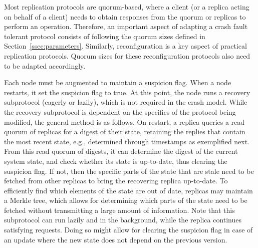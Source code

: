 Most replication protocols are quorum-based, where a client (or a
replica acting on behalf of a client) needs to obtain responses
from the quorum or replicas to perform an operation.  Therefore,
an important aspect of adapting a crash fault tolerant protocol
consists of following the quorum sizes defined in
Section~\ref{ssec:parameters}. Similarly, reconfiguration is
a key aspect of practical replication protocols. Quorum sizes for
these reconfiguration protocols also need to be adapted
accordingly.

Each node must be augmented to maintain a suspicion flag. When a node
restarts, it set the suspicion flag to true. At this point, the node
runs a recovery subprotocol (eagerly or lazily), which is not required
in the crash model.
While the recovery subprotocol is dependent on the specifics of
the protocol being modified, the general method is as follows. On
restart, a replica queries a read quorum of replicas for a digest
of their state, retaining the replies that contain the most
recent state, e.g., determined through timestamps as exemplified
next.  From this read quorum of digests, it can determine the
digest of the current system state, and check whether its state
is up-to-date, thus clearing the suspicion flag. If not, then the
specific parts of the state that are stale need to be fetched
from other replicas to bring the recovering replica up-to-date.
To efficiently find which elements of the state are out of date,
replicas may maintain a Merkle tree, which allows for determining
which parts of the state need to be fetched without transmitting
a large amount of information. Note that this subprotocol can run
lazily and in the background, while the replica continues
satisfying requests. Doing so might allow for clearing the
suspicion flag in case of an update where the new state does not
depend on the previous version.

